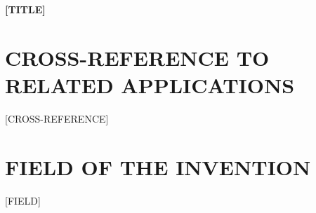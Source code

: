 \documentclass[12pt,letterpaper]{article}
\begin{document}

\begin{center}
\Large\bfseries
[TITLE]
\end{center}

\vspace{0.5in}


\vspace{1in}

\section*{CROSS-REFERENCE TO RELATED APPLICATIONS}

[CROSS-REFERENCE]


\section*{FIELD OF THE INVENTION}

[FIELD]

\end{document}
